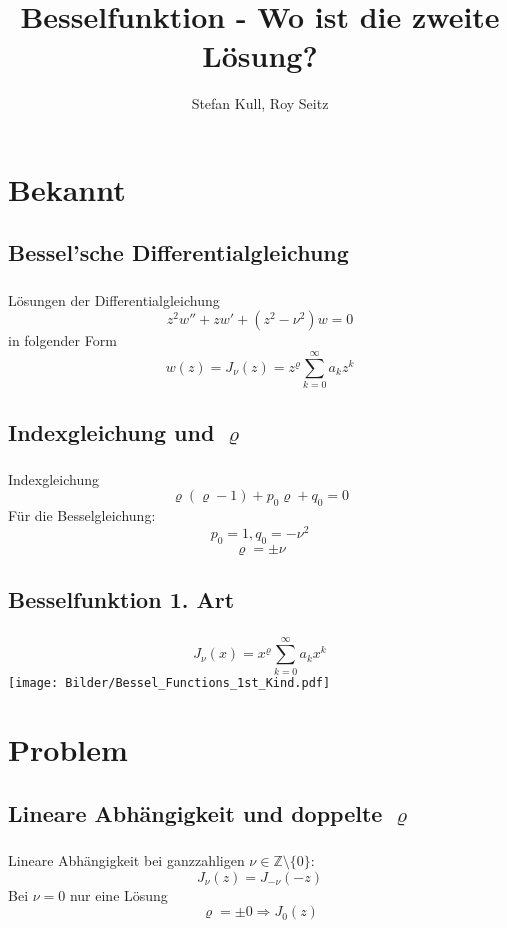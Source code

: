 \documentclass{beamer}
\author{Stefan Kull, Roy Seitz}
\title{Besselfunktion - Wo ist die zweite Lösung?}
\newenvironment{slide}
{\begin{frame}[environment=slide]
	\frametitle{\insertsection}
	\framesubtitle{\insertsubsection}}
{\end{frame}}
\begin{document}
	
	\begin{slide}
		\titlepage
	\end{slide}
	
	
\section{Bekannt}	
\subsection{Bessel'sche Differentialgleichung}	
	\begin{slide}
		Lösungen der Differentialgleichung
		$$ z^2w''+zw'+(z^2-\nu^2)w=0 $$
		in folgender Form
		$$
		w(z)=J_\nu(z)=z^\varrho\sum_{k=0}^{\infty}a_kz^k 
		$$
	\end{slide}
	
\subsection{Indexgleichung und $\varrho$}
	\begin{slide}
		Indexgleichung
		$$\varrho(\varrho-1)+p_0\varrho+q_0=0$$
		Für die Besselgleichung:
		$$p_0=1, q_0=-\nu^2$$
		$$\varrho=\pm\nu $$
	\end{slide}

\subsection{Besselfunktion 1. Art}
	\begin{slide}
		\centering
		$$J_\nu(x)=x^\varrho\sum_{k=0}^{\infty}a_kx^k$$
		\texttt{[image: Bilder/Bessel\_Functions\_1st\_Kind.pdf]}
	\end{slide}

\section{Problem}
\subsection{Lineare Abhängigkeit und doppelte $\varrho$}
	\begin{slide}
		Lineare Abhängigkeit bei ganzzahligen $\nu\in\mathbb{Z}\setminus\{0\}$:
		$$J_\nu(z) = J_{-\nu}(-z)$$
		Bei $\nu=0$ nur eine Lösung
		$$\varrho=\pm 0\Rightarrow J_0(z)$$
	\end{slide}
	
\end{document}
